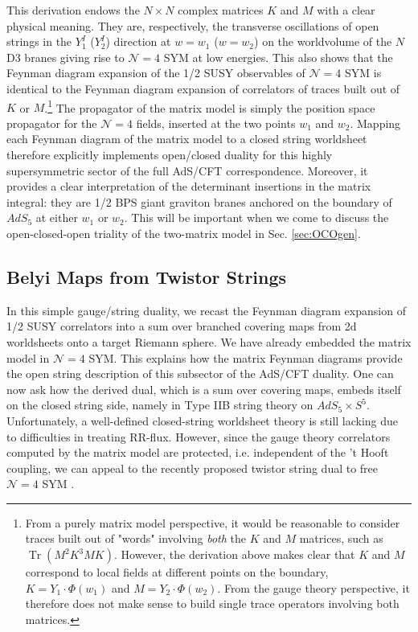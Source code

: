 \documentclass[english]{article}
\DeclareMathOperator{\Tr}{Tr}
\renewcommand{\>}{\rangle}
\newcommand{\<}{\langle}
\renewcommand{\(}{\left(}
\renewcommand{\)}{\right)}
\begin{document}
This derivation endows the $N \times N$ complex matrices $K$ and $M$ with a clear physical meaning. They are, respectively, the transverse oscillations of open strings in the $Y_{1}^{I}$ ($Y_{2}^{I}$) direction at $w=w_1$ ($w=w_2$) on the worldvolume of the $N$ D3 branes giving rise to $\mathcal{N}=4$ SYM at low energies. This also shows that the Feynman diagram expansion of the 1/2 SUSY observables of $\mathcal{N}=4$ SYM is identical to the Feynman diagram expansion of correlators of traces built out of $K$ or $M$.\footnote{From a purely matrix model perspective, it would be reasonable to consider traces built out of "words" involving \textit{both} the $K$ and $M$ matrices, such as $\Tr( M^2 K^3MK)$. However, the derivation above makes clear that $K$ and $M$ correspond to local fields at different points on the boundary, $K = Y_{1} \cdot \Phi (w_1)$ and  $M = Y_{2} \cdot \Phi (w_2)$. From the gauge theory perspective, it therefore does not make sense to build single trace operators involving both matrices.} The propagator of the matrix model is simply the position space propagator for the $\mathcal{N}=4$ fields, inserted at the two points $w_1$ and $w_2$. Mapping each Feynman diagram of the matrix model to a closed string worldsheet therefore explicitly implements open/closed duality for this highly supersymmetric sector of the full AdS/CFT correspondence. Moreover, it provides a clear interpretation of the determinant insertions in the matrix integral: they are 1/2 BPS giant graviton branes anchored on the boundary of $AdS_{5}$ at either $w_1$ or $w_{2}$. This will be important when we come to discuss the open-closed-open triality of the two-matrix model in Sec. \ref{sec:OCOgen}.  


\subsection{Belyi Maps from Twistor Strings}

In this simple gauge/string duality, we recast the Feynman diagram expansion of 1/2 SUSY correlators into a sum over branched covering maps from 2d worldsheets onto a target Riemann sphere. We have already embedded the matrix model in $\mathcal{N}=4$ SYM. This explains how the matrix Feynman diagrams provide the open string description of this subsector of the AdS/CFT duality. One can now ask how the derived dual, which is a sum over covering maps, embeds itself on the closed string side, namely in Type IIB string theory on $AdS_{5} \times S^{5}$. Unfortunately, a well-defined closed-string worldsheet theory is still lacking due to difficulties in treating RR-flux. However, since the gauge theory correlators computed by the matrix model are protected, i.e. independent of the 't Hooft coupling, we can appeal to the recently proposed twistor string dual to free $\mathcal{N}=4$ SYM \cite{gaberdiel2021worldsheet}. 
\end{document}
